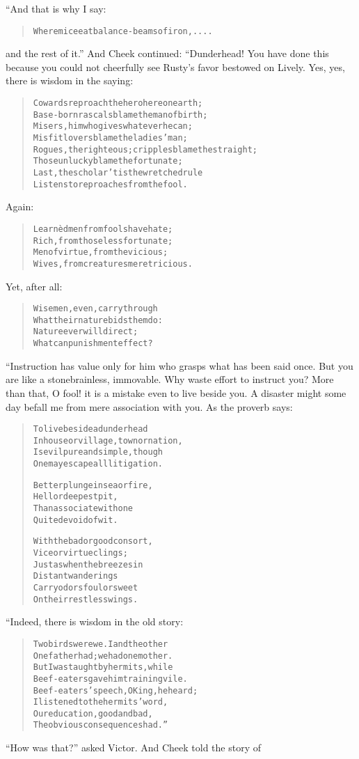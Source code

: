 \documentclass[article, twoside, 14pt]{memoir}
\renewenvironment{verbatim}{%
\begin{quote}%
\vskip -10pt%
\begin{alltt}\normalfont\large}{\end{alltt}%
\end{quote}%
\vskip -10pt
} %
\begin{document}
“And that is why I say:

\begin{verbatim}
Where mice eat balance-beams of iron, ....
\end{verbatim}
and the rest of it.” And Cheek continued: “Dunderhead! You have
done this because you could not cheerfully see Rusty's favor
bestowed on Lively. Yes, yes, there is wisdom in the saying:

\begin{verbatim}
Cowards reproach the hero here on earth;
Base-born rascals blame the man of birth;
Misers, him who gives whatever he can;
Misfit lovers blame the ladies' man;
Rogues, the righteous; cripples blame the straight;
Those unlucky blame the fortunate;
Last, the scholar{\textemdash}'tis the wretched rule{\textemdash}
Listens to reproaches from the fool.
\end{verbatim}
Again:

\begin{verbatim}
Learnèd men from fools have hate;
Rich, from those less fortunate;
Men of virtue, from the vicious;
Wives, from creatures meretricious.
\end{verbatim}
Yet, after all:

\begin{verbatim}
Wise men, even, carry through
What their nature bids them do:
Nature ever will direct;
What can punishment effect?
\end{verbatim}
“Instruction has value only for him who grasps what has been said
once. But you are like a stone{\textemdash}brainless, immovable. Why waste
effort to instruct you? More than that, O fool! it is a mistake
even to live beside you. A disaster might some day befall me from
mere association with you. As the proverb says:

\begin{verbatim}
To live beside a dunderhead
    In house or village, town or nation,
Is evil pure and simple, though
    One may escape all litigation.

Better plunge in sea or fire,
    Hell or deepest pit,
Than associate with one
    Quite devoid of wit.

With the bad or good consort,
    Vice or virtue clings;
Just as when the breezes in
    Distant wanderings
Carry odors foul or sweet
    On their restless wings.
\end{verbatim}
“Indeed, there is wisdom in the old story:

\begin{verbatim}
Two birds were we. I and the other
One father had; we had one mother.
But I was taught by hermits, while
Beef-eaters gave him training vile.
Beef-eaters' speech, O King, he heard;
I listened to the hermits' word,
Our education, good and bad,
The obvious consequences had.”
\end{verbatim}
``How was that?'' asked Victor. And Cheek told the story of
\end{document}
